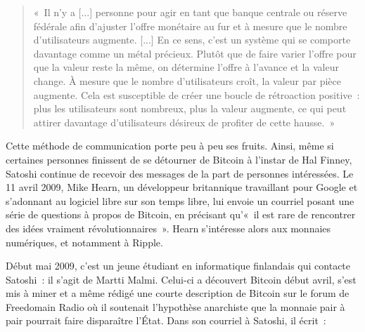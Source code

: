 \begin{quote}
«~Il n'y a [...] personne pour agir en tant que banque centrale ou réserve fédérale afin d'ajuster l'offre monétaire au fur et à mesure que le nombre d'utilisateurs augmente. [...] En ce sens, c'est un système qui se comporte davantage comme un métal précieux. Plutôt que de faire varier l'offre pour que la valeur reste la même, on détermine l'offre à l'avance et la valeur change. À mesure que le nombre d'utilisateurs croît, la valeur par pièce augmente. Cela est susceptible de créer une boucle de rétroaction positive~: plus les utilisateurs sont nombreux, plus la valeur augmente, ce qui peut attirer davantage d'utilisateurs désireux de profiter de cette hausse.~»
\end{quote}


Cette méthode de communication porte peu à peu ses fruits. Ainsi, même si certaines personnes finissent de se détourner de Bitcoin à l'instar de Hal Finney, Satoshi continue de recevoir des messages de la part de personnes intéressées. Le 11 avril 2009, Mike Hearn, un développeur britannique travaillant pour Google et s'adonnant au logiciel libre sur son temps libre, lui envoie un courriel posant une série de questions à propos de Bitcoin, en précisant qu'«~il est rare de rencontrer des idées vraiment révolutionnaires~». Hearn s'intéresse alors aux monnaies numériques, et notamment à Ripple.

Début mai 2009, c'est un jeune étudiant en informatique finlandais qui contacte Satoshi~: il s'agit de Martti Malmi. Celui-ci a découvert Bitcoin début avril, s'est mis à miner et a même rédigé une courte description de Bitcoin sur le forum de Freedomain Radio où il soutenait l'hypothèse anarchiste que la monnaie pair à pair pourrait faire disparaître l'État. Dans son courriel à Satoshi, il écrit~:

